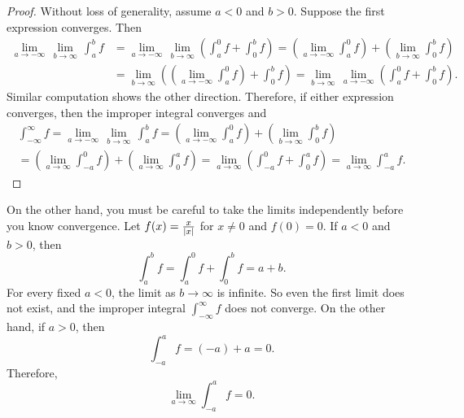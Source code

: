 \begin{proof}
Without loss of generality, assume $a < 0$ and $b > 0$.  Suppose
the first expression converges.  Then
\begin{equation*}
\begin{split}
\lim_{a \to -\infty} \, \lim_{b \to \infty} \, \int_a^b f
& =
\lim_{a \to -\infty} \, \lim_{b \to \infty}
\left(
\int_a^0 f
+
\int_0^b f
\right)
=
\left(
\lim_{a \to -\infty}
\int_a^0 f
\right)
+
\left(
 \lim_{b \to \infty}
\int_0^b f
\right) \\
& = 
 \lim_{b \to \infty}
\left(
\left(
\lim_{a \to -\infty}
\int_a^0 f
\right) 
+
\int_0^b f
\right)
=
 \lim_{b \to \infty} \,
\lim_{a \to -\infty}
\left(
\int_a^0 f
+
\int_0^b f
\right)  .
\end{split}
\end{equation*}
Similar computation shows the other direction.  Therefore, if
either expression converges, then the improper integral converges
and
\begin{multline*}
\int_{-\infty}^\infty f
=
\lim_{a \to -\infty} \, \lim_{b \to \infty} \, \int_a^b f
=
\left(
\lim_{a \to -\infty}
\int_a^0 f
\right)
+
\left(
 \lim_{b \to \infty}
\int_0^b f
\right)
\\
=
\left(
\lim_{a \to \infty}
\int_{-a}^0 f
\right)
+
\left(
 \lim_{a \to \infty}
\int_0^a f
\right)
=
\lim_{a \to \infty}
\left(
\int_{-a}^0 f
+
\int_0^a f
\right)
=
\lim_{a \to \infty}
\int_{-a}^a f .
\end{multline*}
\end{proof}

\begin{example}
On the other hand, you must be careful to
take the limits independently before you know convergence.  Let
$f(x) = \frac{x}{\left\lvert {x} \right\rvert}$ for $x \not= 0$ and $f(0) = 0$.
If $a < 0$ and $b > 0$, then
\begin{equation*}
\int_{a}^b f
=
\int_{a}^0 f
+
\int_{0}^b f
=
a+b .
\end{equation*}
For every fixed $a < 0$, the limit as $b \to \infty$ is infinite.
So even the first limit does not exist,
and the improper integral $\int_{-\infty}^\infty f$ does not converge.
On the other hand, if $a > 0$, then
\begin{equation*}
\int_{-a}^{a} f
=
(-a)+a = 0 .
\end{equation*}
Therefore,
\begin{equation*}
\lim_{a\to\infty}
\int_{-a}^{a} f
= 0 .
\end{equation*}
\end{example}

